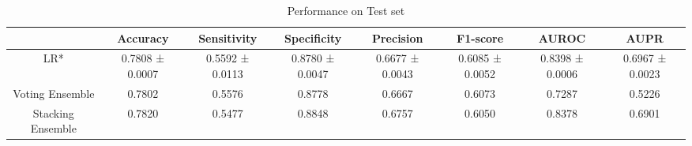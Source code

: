 \begin{table}[h!]
    \centering
    \caption{Performance on Test set}
    \begin{adjustbox}{width=\textwidth}
    \begin{tabular}{|c|c|c|c|c|c|c|c|}
    \hline
      & Accuracy & Sensitivity & Specificity & Precision & F1-score & AUROC & AUPR \\
    \hline
    LR* & 0.7808 ± 0.0007 & 0.5592 ± 0.0113 & 0.8780 ± 0.0047 & 0.6677 ± 0.0043 & 0.6085 ± 0.0052 & 0.8398 ± 0.0006 & 0.6967 ± 0.0023 \\
    \hline
    Voting Ensemble & 0.7802 & 0.5576 & 0.8778 & 0.6667 & 0.6073 & 0.7287 & 0.5226 \\
    \hline
    Stacking Ensemble & 0.7820 & 0.5477 & 0.8848 & 0.6757 & 0.6050 & 0.8378 & 0.6901 \\
    \hline
    \end{tabular}
    \end{adjustbox}
    \end{table}
    
